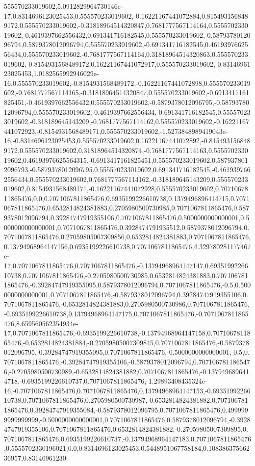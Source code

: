 555570233019602,5.0912829964730146e-17,0.8314696123025453,0.555570233019602,-0.16221167441072884,0.8154931568489172,0.555570233019602,-0.31818964514320847,0.7681777567114164,0.555570233019602,-0.4619397662556432,0.691341716182545,0.555570233019602,-0.5879378012096794,0.5879378012096794,0.555570233019602,-0.691341716182545,0.4619397662556434,0.555570233019602,-0.7681777567114164,0.31818964514320863,0.555570233019602,-0.8154931568489172,0.16221167441072917,0.555570233019602,-0.8314696123025453,1.0182565992946029e-16,0.555570233019602,-0.8154931568489172,-0.16221167441072898,0.555570233019602,-0.7681777567114165,-0.31818964514320847,0.555570233019602,-0.6913417161825451,-0.4619397662556432,0.555570233019602,-0.5879378012096795,-0.5879378012096794,0.555570233019602,-0.4619397662556434,-0.691341716182545,0.555570233019602,-0.318189645143209,-0.7681777567114162,0.555570233019602,-0.16221167441072923,-0.8154931568489171,0.555570233019602,-1.5273848989419043e-16,-0.8314696123025453,0.555570233019602,0.16221167441072892,-0.8154931568489172,0.555570233019602,0.31818964514320874,-0.7681777567114163,0.555570233019602,0.46193976625564315,-0.6913417161825451,0.555570233019602,0.5879378012096793,-0.5879378012096795,0.555570233019602,0.691341716182545,-0.4619397662556434,0.555570233019602,0.7681777567114162,-0.318189645143209,0.555570233019602,0.8154931568489171,-0.16221167441072928,0.555570233019602,0.7071067811865476,0.0,0.7071067811865476,0.6935199226610738,0.1379496896414715,0.7071067811865476,0.6532814824381883,0.2705980500730985,0.7071067811865476,0.5879378012096794,0.39284747919355106,0.7071067811865476,0.5000000000000001,0.5000000000000001,0.7071067811865476,0.3928474791935512,0.5879378012096794,0.7071067811865476,0.27059805007309856,0.6532814824381883,0.7071067811865476,0.13794968964147156,0.6935199226610738,0.7071067811865476,4.329780281177467e-17,0.7071067811865476,0.7071067811865476,-0.13794968964147147,0.6935199226610738,0.7071067811865476,-0.2705980500730985,0.6532814824381883,0.7071067811865476,-0.39284747919355095,0.5879378012096794,0.7071067811865476,-0.5,0.5000000000000001,0.7071067811865476,-0.5879378012096794,0.39284747919355106,0.7071067811865476,-0.6532814824381883,0.2705980500730986,0.7071067811865476,-0.6935199226610738,0.13794968964147175,0.7071067811865476,-0.7071067811865476,8.659560562354934e-17,0.7071067811865476,-0.6935199226610738,-0.13794968964147158,0.7071067811865476,-0.6532814824381884,-0.27059805007309845,0.7071067811865476,-0.5879378012096795,-0.39284747919355095,0.7071067811865476,-0.5000000000000001,-0.5,0.7071067811865476,-0.39284747919355106,-0.5879378012096794,0.7071067811865476,-0.2705980500730989,-0.6532814824381882,0.7071067811865476,-0.1379496896414718,-0.6935199226610737,0.7071067811865476,-1.29893408435324e-16,-0.7071067811865476,0.7071067811865476,0.13794968964147153,-0.6935199226610738,0.7071067811865476,0.2705980500730987,-0.6532814824381882,0.7071067811865476,0.39284747919355084,-0.5879378012096795,0.7071067811865476,0.4999999999999999,-0.5000000000000001,0.7071067811865476,0.5879378012096794,-0.39284747919355106,0.7071067811865476,0.6532814824381882,-0.27059805007309895,0.7071067811865476,0.6935199226610737,-0.13794968964147183,0.7071067811865476,0.5555702330196021,0.0,0.8314696123025453,0.5448951067758184,0.10838637566236957,0.83146961230